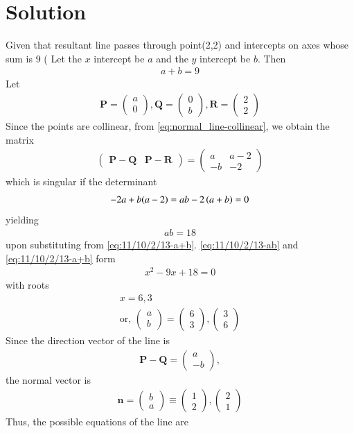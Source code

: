 \documentclass[journal,12pt,twocolumn]{IEEEtran}
\newcommand{\myvec}[1]{\ensuremath{\begin{pmatrix}#1\end{pmatrix}}}
\let\vec\mathbf
\begin{document}
\section{Solution}
Given that resultant line passes through point(2,2) and intercepts on axes whose sum is 9 (
\fi
Let the $x$ intercept be $a$ and the $y$ intercept be $b$. 
Then 
\begin{align}
		\label{eq:11/10/2/13-a+b}
 a + b = 9
\end{align}
Let 
\begin{align}
{\vec{P}}=\myvec{
  a\\
  0}
 , {\vec{Q}}=\myvec{
  0\\
  b}
  , {\vec{R}}=\myvec{
  2\\
  2}
\end{align}
Since the points are collinear, from 
	\eqref{eq:normal_line-collinear},
	we obtain the matrix
\begin{align}
	\myvec{ \vec{P}-\vec{Q} &\vec{P}-\vec{R}} 
	=
	 \myvec{
  a & a-2\\
  -b & -2
 }
\end{align}
which is singular if the determinant
\begin{align}
	-2a +b(a-2) = ab -2\left(a+b\right) = 0
\end{align}
yielding
\begin{align}
	ab = 18
		\label{eq:11/10/2/13-ab}
\end{align}
upon substituting from 
		\eqref{eq:11/10/2/13-a+b}.
		\eqref{eq:11/10/2/13-ab}
		and 
		\eqref{eq:11/10/2/13-a+b}
		form
\begin{align}
	x^2 -9x +18 = 0
\end{align}
with roots
\begin{align}
	x = 6,3
	\\
	\text{or, }
	\myvec{a \\ b} = \myvec{6 \\ 3}, \myvec{3\\6}
\end{align}
Since the direction vector of the line is 
\begin{align}
	\vec{P}-\vec{Q} = \myvec{a \\ -b},
\end{align}
the normal vector is 
\begin{align}
	\vec{n} = \myvec{b \\ a} \equiv \myvec{1 \\ 2}, \myvec{2\\1}
\end{align}
Thus, the possible equations of the line are 
\end{document}
